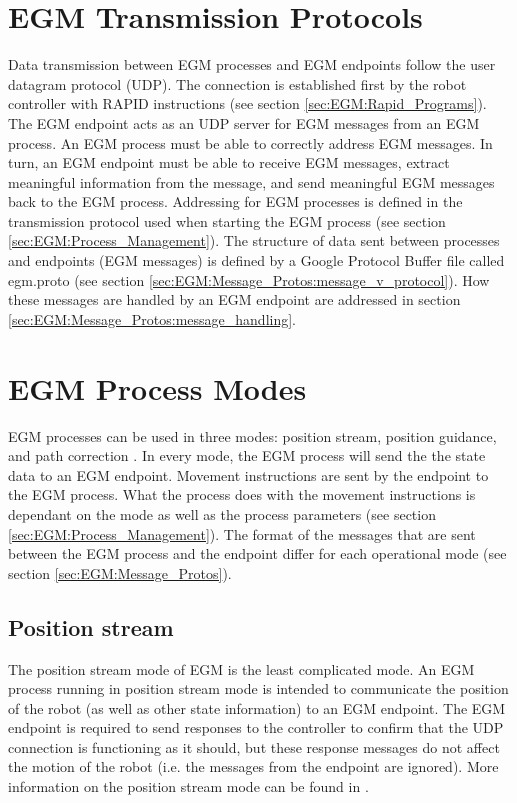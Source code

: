 \documentclass{cslthse-msc}
\begin{document}
\section{EGM Transmission Protocols}
\label{sec:EGM:Trans_Protos}
Data transmission between EGM processes and EGM endpoints follow the user datagram protocol (UDP). The connection is established first by the robot controller with RAPID instructions (see section \ref{sec:EGM:Rapid_Programs}). The EGM endpoint acts as an UDP server for EGM messages from an EGM process. An EGM process must be able to correctly address EGM messages. In turn, an EGM endpoint must be able to receive EGM messages, extract meaningful information from the message, and send meaningful EGM messages back to the EGM process. Addressing for EGM processes is defined in the transmission protocol used when starting the EGM process (see section \ref{sec:EGM:Process_Management}). The structure of data sent between processes and endpoints (EGM messages) is defined by a Google Protocol Buffer file called egm.proto (see section \ref{sec:EGM:Message_Protos:message_v_protocol}). How these messages are handled by an EGM endpoint are addressed in section \ref{sec:EGM:Message_Protos:message_handling}. 


\section{EGM Process Modes}
\label{sec:EGM:Modes}
EGM processes can be used in three modes: position stream, position guidance, and path correction \cite[Sec. 9.3.1.1]{ABB:controller_software}. In every mode, the EGM process will send the the state data to an EGM endpoint. Movement instructions are sent by the endpoint to the EGM process. What the process does with the movement instructions is dependant on the mode as well as the process parameters (see section \ref{sec:EGM:Process_Management}). The format of the messages that are sent between the EGM process and the endpoint differ for each operational mode (see section \ref{sec:EGM:Message_Protos}). 

\subsection{Position stream}
\label{sec:EGM:Modes:stream}
The position stream mode of EGM is the least complicated mode. An EGM process running in position stream mode is intended to communicate the position of the robot (as well as other state information) to an EGM endpoint. The EGM endpoint is required to send responses to the controller to confirm that the UDP connection is functioning as it should, but these response messages do not affect the motion of the robot (i.e. the messages from the endpoint are ignored). More information on the position stream mode can be found in \cite[Sec. 9.3.1.2]{ABB:controller_software}.
\end{document}
